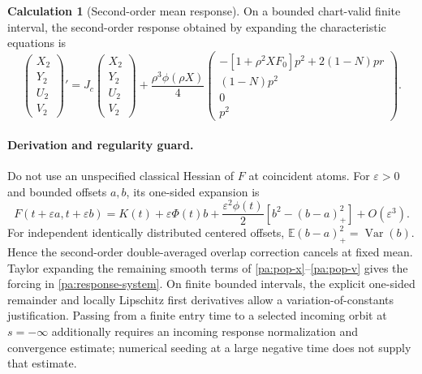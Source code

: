 \documentclass[11pt]{article}
\numberwithin{equation}{section}
\theoremstyle{definition}
\newtheorem{calculation}[proposition]{Calculation}
\theoremstyle{remark}
\newcommand{\E}{\mathbb E}
\newcommand{\1}{\mathbf 1}
\DeclareMathOperator{\Var}{Var}
\begin{document}
\begin{calculation}[Second-order mean response]\label{pa:response-eq}
On a bounded chart-valid finite interval, the second-order response obtained
by expanding the characteristic equations is
\begin{equation}\label{pa:response-system}
 \begin{pmatrix}X_2\\Y_2\\U_2\\V_2\end{pmatrix}'
 =J_c\begin{pmatrix}X_2\\Y_2\\U_2\\V_2\end{pmatrix}
 +\frac{\rho^3\phi(\rho X)}4
 \begin{pmatrix}
 -[1+\rho^2XF_0]p^2+2(1-N)pr\\
 (1-N)p^2\\0\\p^2
 \end{pmatrix}.
\end{equation}
\end{calculation}
\paragraph{Derivation and regularity guard.}
Do not use an unspecified classical Hessian of $F$ at coincident atoms.
For $\varepsilon>0$ and bounded offsets $a,b$, its one-sided expansion is
\[
 F(t+\varepsilon a,t+\varepsilon b)
 =K(t)+\varepsilon\Phi(t)b
 +\frac{\varepsilon^2\phi(t)}2[b^2-(b-a)_+^2]+O(\varepsilon^3).
\]
For independent identically distributed centered offsets,
$\E(b-a)_+^2=\Var(b)$. Hence the second-order double-averaged overlap
correction cancels at fixed mean. Taylor expanding the remaining smooth
terms of \eqref{pa:pop-x}--\eqref{pa:pop-v} gives the forcing in
\eqref{pa:response-system}. On finite bounded intervals, the explicit
one-sided remainder and locally Lipschitz first derivatives allow a
variation-of-constants justification. Passing from a finite entry time to
a selected incoming orbit at $s=-\infty$ additionally requires an incoming
response normalization and convergence estimate; numerical seeding at a
large negative time does not supply that estimate.
\end{document}
